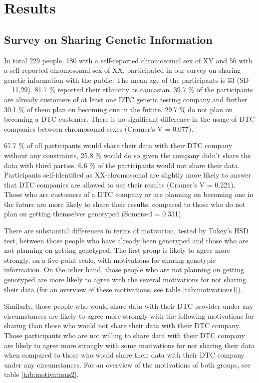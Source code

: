 \documentclass[10pt]{article}
\begin{document}
\section*{Results}
\subsection*{Survey on Sharing Genetic Information}
In total 229 people, 180 with a self-reported chromosomal sex of XY and 56 with a self-reported chromosomal sex of XX, participated in our survey on sharing genetic information with the public. 
The mean age of the participants is 33 (SD = 11,29). 81.7 \% reported their ethnicity as caucasian. 39.7 \% of the participants are already 
customers of at least one DTC genetic testing company and further 30.1 \% of them plan on becoming one in the future. 29.7 \% do not plan on 
becoming a DTC customer. There is no significant difference in the usage of DTC companies between chromosomal sexes (Cramer's V = 0.077). 

67.7 \% of all participants would share their data with their DTC company without any constraints, 25.8 \% would do so given the company 
didn't share the data with third parties. 6.6 \% of the participants would not share their data. Participants self-identified as XX-chromosomal are slightly more likely to answer that DTC companies are allowed to use their results (Cramer's V = 0.221). Those who are customers of a DTC company or are planning on becoming one in 
the future are more likely to share their results, compared to those who do not plan on getting themselves genotyped (Somers-d = 0.331). 


There are substantial differences in terms of motivation, tested by Tukey's HSD test, between those people who have already been genotyped 
and those who are not planning on getting genotyped. The first group is likely to agree more strongly, on a five-point scale, with motivations for sharing genotypic information. On the other hand, those people who are not planning on getting genotyped are more likely to agree with the several motivations 
for not sharing their data (for an overview of these motivations, see table \ref{tab:motivations1}).

Similarly, those people who would share data with their DTC provider under any circumstances are likely to agree more strongly with 
the following motivations for sharing than those who would not share their data with their DTC company.
Those participants who are not willing to share data with their DTC company are likely to agree more strongly with some motivations 
for not sharing their data when compared to those who would share their data with their DTC company under any circumstances. For an overview of the motivations of both groups, see table \ref{tab:motivations2}.
\end{document}
